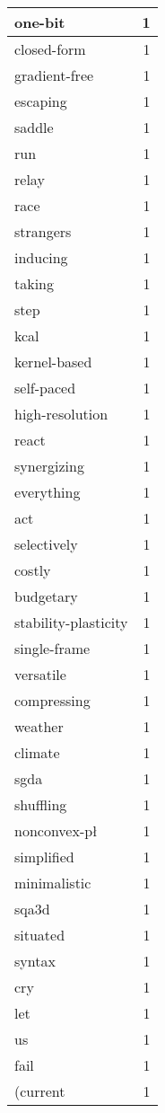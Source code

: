 \begin{table}[h]
\begin{tabular}{|l|r|}
\hline
one-bit & 1 \\
\hline
closed-form & 1 \\
\hline
gradient-free & 1 \\
\hline
escaping & 1 \\
\hline
saddle & 1 \\
\hline
run & 1 \\
\hline
relay & 1 \\
\hline
race & 1 \\
\hline
strangers & 1 \\
\hline
inducing & 1 \\
\hline
taking & 1 \\
\hline
step & 1 \\
\hline
kcal & 1 \\
\hline
kernel-based & 1 \\
\hline
self-paced & 1 \\
\hline
high-resolution & 1 \\
\hline
react & 1 \\
\hline
synergizing & 1 \\
\hline
everything & 1 \\
\hline
act & 1 \\
\hline
selectively & 1 \\
\hline
costly & 1 \\
\hline
budgetary & 1 \\
\hline
stability-plasticity & 1 \\
\hline
single-frame & 1 \\
\hline
versatile & 1 \\
\hline
compressing & 1 \\
\hline
weather & 1 \\
\hline
climate & 1 \\
\hline
sgda & 1 \\
\hline
shuffling & 1 \\
\hline
nonconvex-pł & 1 \\
\hline
simplified & 1 \\
\hline
minimalistic & 1 \\
\hline
sqa3d & 1 \\
\hline
situated & 1 \\
\hline
syntax & 1 \\
\hline
cry & 1 \\
\hline
let & 1 \\
\hline
us & 1 \\
\hline
fail & 1 \\
\hline
(current & 1 \\

\end{tabular}
\end{table}

